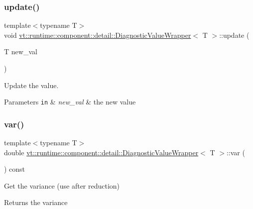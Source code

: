 \subsubsection{\texorpdfstring{update()}{update()}}
{\footnotesize\ttfamily template$<$typename T$>$ \\
void \hyperlink{structvt_1_1runtime_1_1component_1_1detail_1_1_diagnostic_value_wrapper}{vt\+::runtime\+::component\+::detail\+::\+Diagnostic\+Value\+Wrapper}$<$ T $>$\+::update (\begin{DoxyParamCaption}\item[{T}]{new\+\_\+val }\end{DoxyParamCaption})\hspace{0.3cm}{\ttfamily [inline]}}



Update the value. 


\begin{DoxyParams}[1]{Parameters}
\mbox{\tt in}  & {\em new\+\_\+val} & the new value \\
\hline
\end{DoxyParams}
\mbox{\label{structvt_1_1runtime_1_1component_1_1detail_1_1_diagnostic_value_wrapper_ab808d81bb77d4fa29de764a6ab7c1943}} 
\subsubsection{\texorpdfstring{var()}{var()}}
{\footnotesize\ttfamily template$<$typename T$>$ \\
double \hyperlink{structvt_1_1runtime_1_1component_1_1detail_1_1_diagnostic_value_wrapper}{vt\+::runtime\+::component\+::detail\+::\+Diagnostic\+Value\+Wrapper}$<$ T $>$\+::var (\begin{DoxyParamCaption}{ }\end{DoxyParamCaption}) const\hspace{0.3cm}{\ttfamily [inline]}}



Get the variance (use after reduction) 

\begin{DoxyReturn}{Returns}
the variance 
\end{DoxyReturn}


